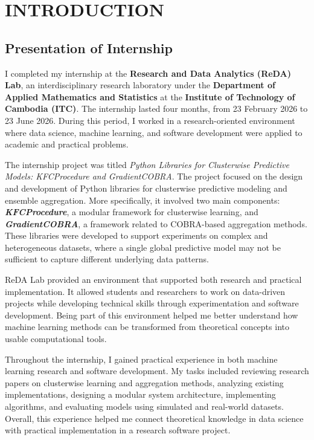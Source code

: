 \chapter{INTRODUCTION}

\section{Presentation of Internship}

\hs I completed my internship at the \textbf{Research and Data Analytics (ReDA) Lab}, an interdisciplinary research laboratory under the \textbf{Department of Applied Mathematics and Statistics} at the \textbf{Institute of Technology of Cambodia (ITC)}. The internship lasted four months, from 23 February 2026 to 23 June 2026. During this period, I worked in a research-oriented environment where data science, machine learning, and software development were applied to academic and practical problems.

The internship project was titled \textit{Python Libraries for Clusterwise Predictive Models: KFCProcedure and GradientCOBRA}. The project focused on the design and development of Python libraries for clusterwise predictive modeling and ensemble aggregation. More specifically, it involved two main components: \textbf{\textit{KFCProcedure}}, a modular framework for clusterwise learning, and \textbf{\textit{GradientCOBRA}}, a framework related to COBRA-based aggregation methods. These libraries were developed to support experiments on complex and heterogeneous datasets, where a single global predictive model may not be sufficient to capture different underlying data patterns.

ReDA Lab provided an environment that supported both research and practical implementation. It allowed students and researchers to work on data-driven projects while developing technical skills through experimentation and software development. Being part of this environment helped me better understand how machine learning methods can be transformed from theoretical concepts into usable computational tools.

Throughout the internship, I gained practical experience in both machine learning research and software development. My tasks included reviewing research papers on clusterwise learning and aggregation methods, analyzing existing implementations, designing a modular system architecture, implementing algorithms, and evaluating models using simulated and real-world datasets. Overall, this experience helped me connect theoretical knowledge in data science with practical implementation in a research software project.

